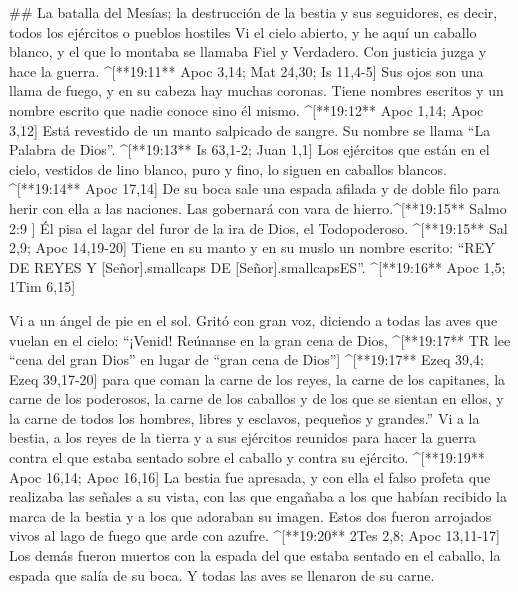 \begin{paracols}{2}
## La batalla del Mesías; la destrucción de la bestia y sus seguidores, es decir, todos los ejércitos o pueblos hostiles
 Vi el cielo abierto, y he aquí un caballo blanco, y el que lo montaba se llamaba Fiel y Verdadero. Con justicia juzga y hace la guerra. ^[**19:11** Apoc 3,14; Mat 24,30; Is 11,4-5]  Sus ojos son una llama de fuego, y en su cabeza hay muchas coronas. Tiene nombres escritos y un nombre escrito que nadie conoce sino él mismo. ^[**19:12** Apoc 1,14; Apoc 3,12]  Está revestido de un manto salpicado de sangre. Su nombre se llama “La Palabra de Dios”. ^[**19:13** Is 63,1-2; Juan 1,1]  Los ejércitos que están en el cielo, vestidos de lino blanco, puro y fino, lo siguen en caballos blancos. ^[**19:14** Apoc 17,14]  De su boca sale una espada afilada y de doble filo para herir con ella a las naciones. Las gobernará con vara de hierro.^[**19:15** Salmo 2:9 ] Él pisa el lagar del furor de la ira de Dios, el Todopoderoso. ^[**19:15** Sal 2,9; Apoc 14,19-20]  Tiene en su manto y en su muslo un nombre escrito: “REY DE REYES Y [Señor]{.smallcaps} DE [Señor]{.smallcaps}ES”. ^[**19:16** Apoc 1,5; 1Tim 6,15]

 Vi a un ángel de pie en el sol. Gritó con gran voz, diciendo a todas las aves que vuelan en el cielo: “¡Venid! Reúnanse en la gran cena de Dios, ^[**19:17** TR lee “cena del gran Dios” en lugar de “gran cena de Dios”] ^[**19:17** Ezeq 39,4; Ezeq 39,17-20]  para que coman la carne de los reyes, la carne de los capitanes, la carne de los poderosos, la carne de los caballos y de los que se sientan en ellos, y la carne de todos los hombres, libres y esclavos, pequeños y grandes.”  Vi a la bestia, a los reyes de la tierra y a sus ejércitos reunidos para hacer la guerra contra el que estaba sentado sobre el caballo y contra su ejército. ^[**19:19** Apoc 16,14; Apoc 16,16]  La bestia fue apresada, y con ella el falso profeta que realizaba las señales a su vista, con las que engañaba a los que habían recibido la marca de la bestia y a los que adoraban su imagen. Estos dos fueron arrojados vivos al lago de fuego que arde con azufre. ^[**19:20** 2Tes 2,8; Apoc 13,11-17]  Los demás fueron muertos con la espada del que estaba sentado en el caballo, la espada que salía de su boca. Y todas las aves se llenaron de su carne.

\switchcolumn
\begin{english}


\end{english}
\end{paracols}
